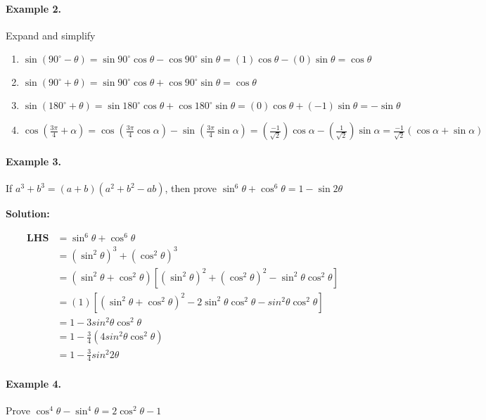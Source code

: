 \documentclass{article}
\begin{document}
\paragraph{Example 2.}
Expand and simplify

\begin{enumerate}[label=\roman*)]
\item $\sin(90^{\circ}-\theta) = \sin90^{\circ}\cos\theta - \cos90^{\circ}\sin\theta = (1)\cos\theta - (0)\sin\theta = \cos\theta$
\item $\sin(90^{\circ}+\theta) = \sin90^{\circ}\cos\theta + \cos90^{\circ}\sin\theta = \cos\theta$
\item $\sin(180^{\circ}+\theta) = \sin180^{\circ}\cos\theta + \cos180^{\circ}\sin\theta = (0)\cos\theta + (-1)\sin\theta = -\sin\theta$
        \item $\cos(\frac{3\pi}{4}+\alpha) = \cos(\frac{3\pi}{4}\cos\alpha) - \sin(\frac{3\pi}{4}\sin\alpha) = (\frac{-1}{\sqrt{2}})\cos\alpha - (\frac{1}{\sqrt{2}})\sin\alpha = \frac{-1}{\sqrt{2}}(\cos\alpha + \sin\alpha)$
\end{enumerate}

\paragraph{Example 3.}
If $a^{3}+b^{3} = (a+b)(a^{2}+b^{2}-ab)$, then prove $\sin^{6}\theta + \cos^{6}\theta = 1 - \sin 2\theta$

{\scriptsize \textbf{Solution:}}

\[
  \begin{aligned}
    \textbf{LHS} &= \sin^{6}\theta + \cos^{6}\theta \\
                 &= (\sin^{2}\theta)^{3} + (\cos^{2}\theta)^{3} \\
                 &= (\sin^{2}\theta+\cos^{2}\theta)[(\sin^{2}\theta)^{2}+(\cos^{2}\theta)^{2} - \sin^{2}\theta \cos^{2}\theta] \\
                 &= (1) [(\sin^{2}\theta+\cos^{2}\theta)^{2} - 2\sin^{2}\theta \cos^{2}\theta - sin^{2}\theta \cos^{2}\theta] \\
                 &= 1 - 3 sin^{2}\theta \cos^{2}\theta \\
                 &= 1 - \frac{3}{4} (4sin^{2}\theta \cos^{2}\theta) \\
                 &= 1 - \frac{3}{4} sin^{2}2\theta
  \end{aligned}
\]

\paragraph{Example 4.}
Prove $\cos^{4}\theta-\sin^{4}\theta = 2\cos^{2}\theta-1$
\end{document}
